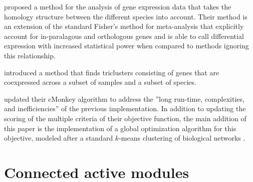 	\Textcite{kristiansson2013novel} proposed a method for the analysis of gene expression data that takes the homology structure between the different species into account.
	Their method is an extension of the standard Fisher's method for meta-analysis \parencites{hu2006statistical}{campain2010comparison}{tseng2012comprehensive} that explicitly account for in-paralagous and orthologous genes and is able to call differential expression with increased statistical power when compared to methods ignoring this relationship.

	\Textcite{dede2014triclust} introduced a method that finds triclusters consisting of genes that are coexpressed across a subset of samples and a subset of species.

	\Textcite{reiss2015cmonkey2} updated their cMonkey algorithm \parencite{reiss2006integrated} to address the ''long run-time, complexities, and inefficiencies'' of the previous implementation.
	In addition to updating the scoring of the multiple criteria of their objective function, the main addition of this paper is the implementation of a global optimization algorithm for this objective, modeled after a standard $k$-means clustering of biological networks \parencite{watts1998collective}.


\section{Connected active modules}


